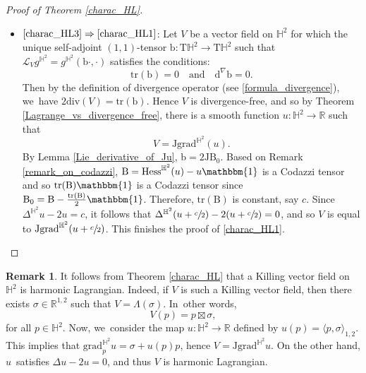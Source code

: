 \documentclass[JEP,XML,SOM,Unicode,NoEqCountersInSection, NoFloatCountersInSection,published]{cedram}
\theoremstyle{plain}
\theoremstyle{definition}
\newtheorem{remark}[cor]{Remark}
\newcommand{\bb}{\mathrm{b}}
\newcommand{\minko}{\mathbb{R}^{1,2}}
\newcommand{\grad}{\mathrm{grad}^{\mathbb{H}^2}}
\newcommand{\hess}{\mathrm{Hess}^{\mathbb{H}^2}}
\newcommand{\J}{\mathrm{J}}
\newcommand{\B}{\mathrm{B}}
\newcommand{\inner}[1] {\langle #1 \rangle}
\begin{document}
\begin{proof}[Proof of Theorem \ref{charac_HL}]
\begin{itemize}
\item
$\eqref{charac_HL3}\Rightarrow\eqref{charac_HL1}$: Let \(V \) be a vector field on \(\mathbb{H}^2\) for which the unique self-adjoint \((1,1)\)-tensor \(\bb: \mathrm{T}\mathbb{H}^2 \to \mathrm{T}\mathbb{H}^2\) such that \(\mathcal{L}_V g^{\mathbb{H}^2} = g^{\mathbb{H}^2}(\bb \cdot, \cdot)\) satisfies the conditions:
\[
\mathrm{tr}(\bb) = 0 \quad \text{and} \quad \mathrm{d}^{\nabla} \bb = 0.
\]
Then by the definition of divergence operator (see \eqref{formula_divergence}), we~have $2\mathrm{div}(V)=\mathrm{tr}(\mathrm{b})$. Hence \(V \) is divergence-free, and so by Theorem \ref{Lagrange_vs_divergence_free}, there is a smooth function \hbox{\(u:\mathbb{H}^2 \to \mathbb{R} \)} such that
\[ V = \J \grad(u). \]
By Lemma \ref{Lie_derivative_of_Ju}, \(\bb = 2 \J \B_0\). Based on Remark \ref{remark_on_codazzi}, \(\B = \hess(u) - u \mathbbm{1}\) is a Codazzi tensor and so \(\mathrm{tr}(\B)\mathbbm{1}\) is a Codazzi tensor since \(\B_0 = \B - \frac{\mathrm{tr}(\B)}{2} \mathbbm{1}\). Therefore, \(\mathrm{tr}(\B)\) is constant, say \(c \). Since \(\Delta^{\mathbb{H}^2} u - 2u = c\), it follows that \(\Delta^{\mathbb{H}^2}(u + \sfrac{c}{2}) - 2(u + \sfrac{c}{2}) = 0\), and so \(V \) is equal to \(\J \grad(u + \sfrac{c}{2})\). This finishes the proof of \eqref{charac_HL1}.\qedhere
\end{itemize}
\end{proof}

\begin{remark}\label{Killing_are_harmonic}
It follows from Theorem \ref{charac_HL} that a Killing vector field on $\mathbb{H}^2$ is harmonic Lagrangian. Indeed, if $V$ is such a Killing vector field, then there exists $\sigma\in\minko$ such that $V=\Lambda(\sigma)$. In~other words,
\[
V(p)=p\boxtimes\sigma,
\]
for all $p\in\mathbb{H}^2$. Now, we~consider the map $u:\mathbb{H}^2\to\mathbb{R}$ defined by $u(p)=\inner{p,\sigma}_{1,2}$. This implies that $\grad_p u=\sigma+u(p)p$, hence $V=\J\grad u$. On the other hand, $u$~satisfies $\Delta u-2u=0$, and thus $V$ is harmonic Lagrangian.
\end{remark}
\end{document}
